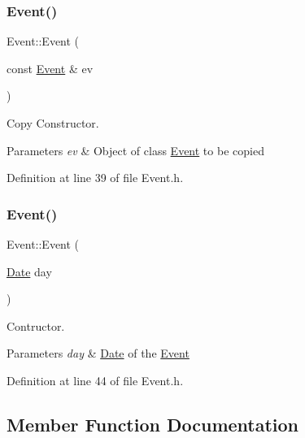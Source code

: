 \subsubsection{\texorpdfstring{Event()}{Event()}\hspace{0.1cm}{\footnotesize\ttfamily [2/3]}}
{\footnotesize\ttfamily Event\+::\+Event (\begin{DoxyParamCaption}\item[{const \hyperlink{class_event}{Event} \&}]{ev }\end{DoxyParamCaption})\hspace{0.3cm}{\ttfamily [inline]}}



Copy Constructor. 


\begin{DoxyParams}{Parameters}
{\em ev} & Object of class \hyperlink{class_event}{Event} to be copied \\
\hline
\end{DoxyParams}


Definition at line 39 of file Event.\+h.

\hypertarget{class_event_ad13c7b9652c4e3ab546d86406097d23a}{}\label{class_event_ad13c7b9652c4e3ab546d86406097d23a} 
\subsubsection{\texorpdfstring{Event()}{Event()}\hspace{0.1cm}{\footnotesize\ttfamily [3/3]}}
{\footnotesize\ttfamily Event\+::\+Event (\begin{DoxyParamCaption}\item[{\hyperlink{class_date}{Date}}]{day }\end{DoxyParamCaption})\hspace{0.3cm}{\ttfamily [inline]}}



Contructor. 


\begin{DoxyParams}{Parameters}
{\em day} & \hyperlink{class_date}{Date} of the \hyperlink{class_event}{Event} \\
\hline
\end{DoxyParams}


Definition at line 44 of file Event.\+h.



\subsection{Member Function Documentation}
\hypertarget{class_event_a3efb47d783affa24203f4ba13b355c56}{}\label{class_event_a3efb47d783affa24203f4ba13b355c56} 
